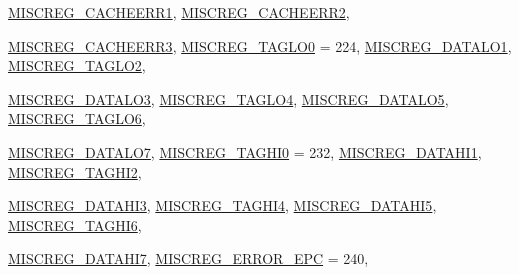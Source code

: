 \begin{DoxyCompactItemize}
\hyperlink{namespaceMipsISA_a1e522017e015d4c7efd6b2360143aa67a6cd7e3eff2dfacee9670e1b372010ea1}{MISCREG\_\-CACHEERR1}, 
\hyperlink{namespaceMipsISA_a1e522017e015d4c7efd6b2360143aa67ad1635a5a66d6eaff975e416e4ea08f40}{MISCREG\_\-CACHEERR2}, 
\par
\hyperlink{namespaceMipsISA_a1e522017e015d4c7efd6b2360143aa67a059e9c9187b0061b193bb8afd16c212a}{MISCREG\_\-CACHEERR3}, 
\hyperlink{namespaceMipsISA_a1e522017e015d4c7efd6b2360143aa67a3d465188f3521f4c8e83ba5c1757ae48}{MISCREG\_\-TAGLO0} =  224, 
\hyperlink{namespaceMipsISA_a1e522017e015d4c7efd6b2360143aa67a1b6b7702fbf4e3803807221865b532a5}{MISCREG\_\-DATALO1}, 
\hyperlink{namespaceMipsISA_a1e522017e015d4c7efd6b2360143aa67ad6df6a8c3e7d33114d6a404d3086f9d2}{MISCREG\_\-TAGLO2}, 
\par
\hyperlink{namespaceMipsISA_a1e522017e015d4c7efd6b2360143aa67a8c70062aee6afee6c2d840a3cbab38cd}{MISCREG\_\-DATALO3}, 
\hyperlink{namespaceMipsISA_a1e522017e015d4c7efd6b2360143aa67a1e09b9f618f53031aff0984d6f0ab550}{MISCREG\_\-TAGLO4}, 
\hyperlink{namespaceMipsISA_a1e522017e015d4c7efd6b2360143aa67ac8f1e507cbe5eec02b96eeebb34ea8e1}{MISCREG\_\-DATALO5}, 
\hyperlink{namespaceMipsISA_a1e522017e015d4c7efd6b2360143aa67aafcca6a7c7d5e822ee31b4025cb09b8b}{MISCREG\_\-TAGLO6}, 
\par
\hyperlink{namespaceMipsISA_a1e522017e015d4c7efd6b2360143aa67aabb7d2d830653dc4d2a74dfb44a23047}{MISCREG\_\-DATALO7}, 
\hyperlink{namespaceMipsISA_a1e522017e015d4c7efd6b2360143aa67a853a222b14a75aabb501594f65c122da}{MISCREG\_\-TAGHI0} =  232, 
\hyperlink{namespaceMipsISA_a1e522017e015d4c7efd6b2360143aa67a07bbb6f59e7fb4fb8aa5044335148d2d}{MISCREG\_\-DATAHI1}, 
\hyperlink{namespaceMipsISA_a1e522017e015d4c7efd6b2360143aa67a72c056bf886381ae83a82d4fe60e00ca}{MISCREG\_\-TAGHI2}, 
\par
\hyperlink{namespaceMipsISA_a1e522017e015d4c7efd6b2360143aa67af076b8056fea2d1175e794e98d653b45}{MISCREG\_\-DATAHI3}, 
\hyperlink{namespaceMipsISA_a1e522017e015d4c7efd6b2360143aa67a441b131850dad58afccb19effa302fec}{MISCREG\_\-TAGHI4}, 
\hyperlink{namespaceMipsISA_a1e522017e015d4c7efd6b2360143aa67a681d12d97bce2cf4e5ca41531ff1736c}{MISCREG\_\-DATAHI5}, 
\hyperlink{namespaceMipsISA_a1e522017e015d4c7efd6b2360143aa67a19c1f710162696c51edfdaa709ce23e2}{MISCREG\_\-TAGHI6}, 
\par
\hyperlink{namespaceMipsISA_a1e522017e015d4c7efd6b2360143aa67aa31007aee0542cb329918d3f9ad76525}{MISCREG\_\-DATAHI7}, 
\hyperlink{namespaceMipsISA_a1e522017e015d4c7efd6b2360143aa67adfdf7cfa583dbd9c3d3bdf70459c4aa1}{MISCREG\_\-ERROR\_\-EPC} =  240, 

\end{DoxyCompactItemize}
